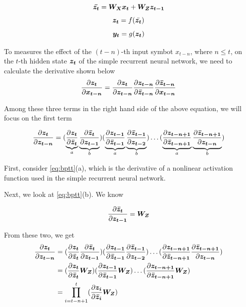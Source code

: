 \[\vect{\bar{z_t}} = \matr{W_X} \vect{x_t} + \matr{W_Z} \vect{z_{t-1}}\]
\[\vect{z_t} = f(\bar{\vect{z_t}})\]
\[\vect{y_t} = g(\vect{z_t})\]

To measures the effect of the $(t-n)$-th input symbot $x_{t-n}$, where $n\leq{t}$, on the $t$-th hidden state $\vect{z_t}$ of the simple recurrent neural network, we need to calculate the derivative shown below
\[\frac{\partial \vect{z_t}}{\partial \vect{x_{t-n}}}=\frac{\partial \vect{z_t}}{\partial \vect{z_{t-n}}}\frac{\partial \vect{z_{t-n}}}{\partial \vect{\bar{z}_{t-n}}}\frac{\partial \vect{\bar{z}_{t-n}}}{\partial \vect{x_{t-n}}}\]

Among these three terms in the right hand side of the above equation, we will focus on the first term

\begin{equation} \label{eq:bptt}
\frac{\partial \vect{z_t}}{\partial \vect{z_{t-n}}} = (\underbrace{\frac{\partial \vect{z_t}}{\partial \vect{\bar{z}_{t}}}}_{a}\underbrace{\frac{\partial \vect{\bar{z}_{t}}}{\partial \vect{z_{t-1}}}}_{b})
(\underbrace{\frac{\partial \vect{z_{t-1}}}{\partial \vect{\bar{z}_{t-1}}}}_{a}\underbrace{\frac{\partial \vect{\bar{z}_{t-1}}}{\partial \vect{z_{t-2}}}}_{b}) \ldots 
(\underbrace{\frac{\partial \vect{z_{t-n+1}}}{\partial \vect{\bar{z}_{t-n+1}}}}_{a}\underbrace{\frac{\partial \vect{\bar{z}_{t-n+1}}}{\partial \vect{z_{t-n}}}}_{b})
\end{equation}

First, consider \cref{eq:bptt}(a), which is the derivative of a nonlinear activation function used in the simple recurrent neural network.

Next, we look at \cref{eq:bptt}(b). We know

\[\frac{\partial \vect{\bar{z}_{t}}}{\partial \vect{z_{t-1}}} = \matr{W_Z}\]

From these two, we get
\begin{align} \label{eq:bptt_result}
\begin{split}
\frac{\partial \vect{z_t}}{\partial \vect{z_{t-n}}} &= (\frac{\partial \vect{z_t}}{\partial \vect{\bar{z}_{t}}}\frac{\partial \vect{\bar{z}_{t}}}{\partial \vect{z_{t-1}}})
(\frac{\partial \vect{z_{t-1}}}{\partial \vect{\bar{z}_{t-1}}}\frac{\partial \vect{\bar{z}_{t-1}}}{\partial \vect{z_{t-2}}}) \ldots 
(\frac{\partial \vect{z_{t-n+1}}}{\partial \vect{\bar{z}_{t-n+1}}}\frac{\partial \vect{\bar{z}_{t-n+1}}}{\partial \vect{z_{t-n}}}) \\
&= (\frac{\partial \vect{z_t}}{\partial \vect{\bar{z}_{t}}}\matr{W_Z})
(\frac{\partial \vect{z_{t-1}}}{\partial \vect{\bar{z}_{t-1}}}\matr{W_Z}) \ldots 
(\frac{\partial \vect{z_{t-n+1}}}{\partial \vect{\bar{z}_{t-n+1}}}\matr{W_Z}) \\
&= \prod\limits_{i=t-n+1}^{t} (\frac{\partial \vect{z_i}}{\partial \vect{\bar{z}_{i}}}\matr{W_Z})
\end{split}
\end{align}

